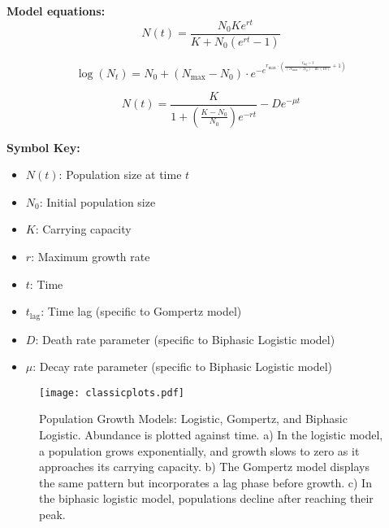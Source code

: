 \documentclass{article}
\begin{document}
\vspace{10pt}
\begin{tcolorbox}[colframe=black, colback=gray!10, boxrule=0.5mm]
\textbf{Model equations:}
\[
N(t) = \frac{N_0 K e^{r t}}{K + N_0 \left( e^{r t} - 1 \right)} \tag{1}
\]

\vspace{10pt}

\[
\log(N_t) = N_0 + (N_{\text{max}} - N_0) \cdot e^{-e^{r_{\text{max}} \cdot \left( \frac{t_{\text{lag}} - t}{(N_{\text{max}} - N_0) \cdot \ln(10)} + 1 \right)}} \tag{2}
\]


\vspace{10pt}

\[
N(t) = \frac{K}{1 + \left( \frac{K - N_0}{N_0} \right) e^{-r t}} - D e^{-\mu t} \tag{3}
\]

\vspace{10pt}

\textbf{Symbol Key:}
\begin{itemize}
    \item \( N(t) \): Population size at time \( t \)
    \item \( N_0 \): Initial population size
    \item \( K \): Carrying capacity
    \item \( r \): Maximum growth rate
    \item \( t \): Time
    \item \( t_{\text{lag}} \): Time lag (specific to Gompertz model)
    \item \( D \): Death rate parameter (specific to Biphasic Logistic model)
    \item \( \mu \): Decay rate parameter (specific to Biphasic Logistic model)
\end{itemize}
\end{tcolorbox}
\vspace{10pt}

\begin{figure}
    \centering
    \texttt{[image: classicplots.pdf]}
    \caption{Population Growth Models: Logistic, Gompertz, and Biphasic Logistic. Abundance is plotted against time. a) In the logistic model, a population grows exponentially, and growth slows to zero as it approaches its carrying capacity. b) The Gompertz model displays the same pattern but incorporates a lag phase before growth. c) In the biphasic logistic model, populations decline after reaching their peak.  }
    \label{fig:enter-label}
\end{figure}
\end{document}
